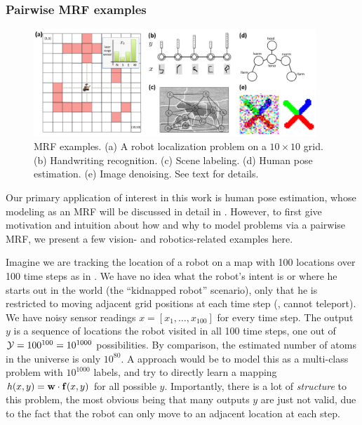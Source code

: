 \subsubsection{Pairwise MRF examples}\label{sec:pairwise-mrf}
\begin{figure}[tb]
\begin{center}
\includegraphics[width=0.95\textwidth]{figs/mrf-examples.pdf}
\caption[MRF examples]{MRF examples.  (a) A robot localization problem on a $10 
\times 10$ grid. (b) Handwriting recognition.  (c) Scene labeling.  (d) Human 
pose estimation.  (e) Image denoising. See text for details. }
\label{fig:mrf-examples}
\end{center}
\end{figure}



Our primary application of interest in this work is human pose estimation, 
whose modeling as an MRF will be discussed in detail in .  However, 
to first give motivation and intuition about how and why to model problems via 
a pairwise MRF, we present a few vision- and robotics-related examples here.

Imagine we are tracking the location of a robot on a map with 100 locations 
over 100 time steps as in .  We have no idea what the 
robot's intent is or where he starts out in the world (the ``kidnapped robot'' 
scenario), only that he is restricted to moving adjacent grid positions at each 
time step (\ie, cannot teleport).  We have noisy sensor readings $x = 
[x_1,\ldots,x_{100}]$ for every time step.  The output $y$ is a sequence of 
locations the robot visited in all 100 time steps, one out of $\mathcal{Y} = 100^{100} 
= 10^{1000}$ possibilities.  By comparison, the estimated number of atoms in 
the universe is only $10^{80}$.  A \naive approach would be to model this as a 
multi-class problem with $10^{1000}$ labels, and try to directly learn a 
mapping $h(x,y) = \mathbf{w} \cdot \mathbf{f}(x,y)$ for all possible $y$.  Importantly, there 
is a lot of {\em structure} to this problem, the most obvious being that many 
outputs $y$ are just not valid, due to the fact that the robot can only move to 
an adjacent location at each step.

